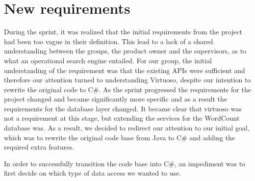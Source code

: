 \section{New requirements} \label{ssec:newRequirements}
During the sprint, it was realized that the initial requirements from the \knox{} project had been too vague in their definition. This lead to a lack of a shared understanding between the groups, the product owner and the supervisors, as to what an operational search engine entailed. For our group, the initial understanding of the requirement was that the existing APIs were sufficient and therefore our attention turned to understanding Virtuoso, despite our intention to rewrite the original code to C\#. 
As the sprint progressed the requirements for the \knox{} project changed and became significantly more specific and as a result the requirements for the database layer changed. It became clear that virtuoso was not a requirement at this stage, but extending the services for the WordCount database was. As a result, we decided to redirect our attention to our initial goal, which was to rewrite the original code base from Java to C\# and adding the required extra features.

In order to successfully transition the code base into C\#, an impediment was to first decide on which type of data access we wanted to use.
